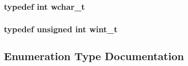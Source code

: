 \subsubsection[{wchar\_\-t}]{\setlength{\rightskip}{0pt plus 5cm}typedef int {\bf wchar\_\-t}}\label{controller_2tp_8c_a9c277a3fd853029cc853c877bcd32e8e}
\subsubsection[{wint\_\-t}]{\setlength{\rightskip}{0pt plus 5cm}typedef unsigned int {\bf wint\_\-t}}\label{controller_2tp_8c_aae8fec8a77257a9718887040067a3f09}


\subsection{Enumeration Type Documentation}
